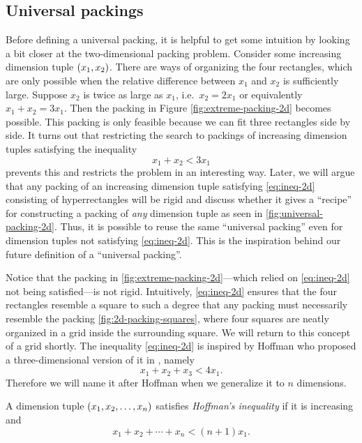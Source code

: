 \subsection{Universal packings} Before defining a universal packing, it is helpful to get some intuition by looking a bit closer at the two-dimensional packing problem. Consider some increasing dimension tuple $\left( x_1, x_2 \right)$. There are ways of organizing the four rectangles, which are only possible when the relative difference between $x_1$ and $x_2$ is sufficiently large. Suppose $x_2$ is twice as large as $x_1$, i.e.\ $x_2 = 2x_1$ or equivalently $x_1 + x_2 = 3 x_1$. Then the packing in Figure \ref{fig:extreme-packing-2d} becomes possible. This packing is only feasible because we can fit three rectangles side by side. It turns out that restricting the search to packings of increasing dimension tuples satisfying the inequality
\begin{equation}\label{eq:ineq-2d}
x_1 + x_2 < 3x_1
\end{equation}
prevents this and restricts the problem in an interesting way. Later, we will argue that any packing of an increasing dimension tuple satisfying \eqref{eq:ineq-2d} consisting of hyperrectangles will be rigid and discuss whether it gives a ``recipe'' for constructing a packing of \textit{any} dimension tuple as seen in \cref{fig:universal-packing-2d}. Thus, it is possible to reuse the same ``universal packing'' even for dimension tuples not satisfying \eqref{eq:ineq-2d}. This is the inspiration behind our future definition of a ``universal packing''.

Notice that the packing in \cref{fig:extreme-packing-2d}---which relied on \eqref{eq:ineq-2d} not being satisfied---is not rigid. Intuitively, \eqref{eq:ineq-2d} ensures that the four rectangles resemble a square to such a degree that any packing must necessarily resemble the packing \cref{fig:2d-packing-squares}, where four squares are neatly organized in a grid inside the surrounding square. We will return to this concept of a grid shortly. The inequality \eqref{eq:ineq-2d} is inspired by Hoffman who proposed a three-dimensional version of it in \cite[p. 215]{Hoffman1981}, namely
\begin{equation}\label{eq:ineq-3d}
x_1 + x_2 + x_3 < 4x_1.
\end{equation}
Therefore we will name it after Hoffman when we generalize it to $n$ dimensions.

\begin{definition}
A dimension tuple $\left( x_1, x_2, \dotsc, x_n \right)$ satisfies \textit{Hoffman's inequality} if it is increasing and
\[
x_1 + x_2 + \dotsb + x_n < (n + 1)x_1.
\]
\end{definition}

